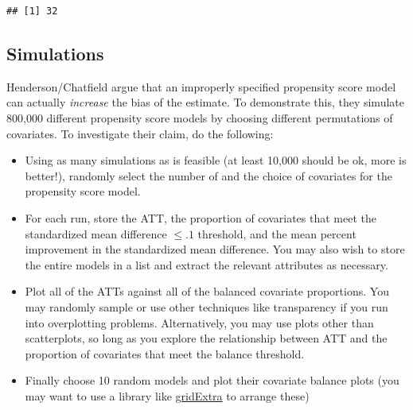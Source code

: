 \documentclass[
]{article}
\newenvironment{Shaded}{\begin{snugshade}}{\end{snugshade}}
\newcommand{\AttributeTok}[1]{\textcolor[rgb]{0.13,0.29,0.53}{#1}}
\newcommand{\CommentTok}[1]{\textcolor[rgb]{0.56,0.35,0.01}{\textit{#1}}}
\newcommand{\ConstantTok}[1]{\textcolor[rgb]{0.56,0.35,0.01}{#1}}
\newcommand{\FloatTok}[1]{\textcolor[rgb]{0.00,0.00,0.81}{#1}}
\newcommand{\FunctionTok}[1]{\textcolor[rgb]{0.13,0.29,0.53}{\textbf{#1}}}
\newcommand{\NormalTok}[1]{#1}
\newcommand{\OtherTok}[1]{\textcolor[rgb]{0.56,0.35,0.01}{#1}}
\newcommand{\SpecialCharTok}[1]{\textcolor[rgb]{0.81,0.36,0.00}{\textbf{#1}}}
\begin{document}
\begin{Shaded}
\end{Shaded}

\begin{verbatim}
## [1] 32
\end{verbatim}

\hypertarget{simulations}{%
\subsection{Simulations}\label{simulations}}

Henderson/Chatfield argue that an improperly specified propensity score
model can actually \textit{increase} the bias of the estimate. To
demonstrate this, they simulate 800,000 different propensity score
models by choosing different permutations of covariates. To investigate
their claim, do the following:

\begin{itemize}
    \item Using as many simulations as is feasible (at least 10,000 should be ok, more is better!), randomly select the number of and the choice of covariates for the propensity score model.
    \item For each run, store the ATT, the proportion of covariates that meet the standardized mean difference $\leq .1$ threshold, and the mean percent improvement in the standardized mean difference. You may also wish to store the entire models in a list and extract the relevant attributes as necessary.
    \item Plot all of the ATTs against all of the balanced covariate proportions. You may randomly sample or use other techniques like transparency if you run into overplotting problems. Alternatively, you may use plots other than scatterplots, so long as you explore the relationship between ATT and the proportion of covariates that meet the balance threshold.
    \item Finally choose 10 random models and plot their covariate balance plots (you may want to use a library like \href{https://cran.r-project.org/web/packages/gridExtra/index.html}{gridExtra} to arrange these)
\end{itemize}
\end{document}

